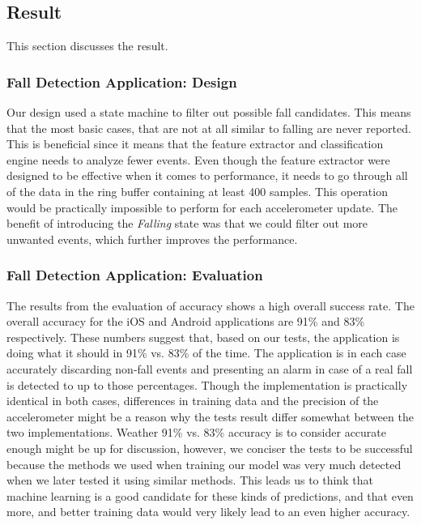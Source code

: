 \documentclass[12pt, a4paper, onecolumn]{article}
\begin{document}
	\subsection{Result}
	
	This section discusses the result.
	
	\subsubsection{Fall Detection Application: Design}
	
	Our design used a state machine to filter out possible fall candidates. This means that the most basic cases, that are not at all similar to falling are never reported. This is beneficial since it means that the feature extractor and classification engine needs to analyze fewer events. Even though the feature extractor were designed to be effective when it comes to performance, it needs to go through all of the data in the ring buffer containing at least 400 samples. This operation would be practically impossible to perform for each accelerometer update. The benefit of introducing the \textit{Falling} state was that we could filter out more unwanted events, which further improves the performance.
	
	\subsubsection{Fall Detection Application: Evaluation}
	
	The results from the evaluation of accuracy shows a high overall success rate. The overall accuracy for the iOS and Android applications are 91\% and 83\% respectively. These numbers suggest that, based on our tests, the application is doing what it should in 91\% vs. 83\% of the time. The application is in each case accurately discarding non-fall events and presenting an alarm in case of a real fall is detected to up to those percentages.  Though the implementation is practically identical in both cases, differences in training data and the precision of the accelerometer might be a reason why the tests result differ somewhat between the two implementations. Weather 91\% vs. 83\% accuracy is to consider accurate enough might be up for discussion, however, we conciser the tests to be successful because the methods we used when training our model was very much detected when we later tested it using similar methods. This leads us to think that machine learning is a good candidate for these kinds of predictions, and that even more, and better training data would very likely lead to an even higher accuracy. 
	
\end{document}
